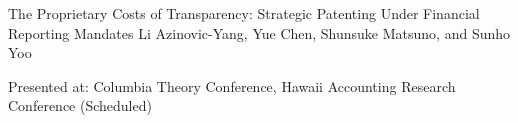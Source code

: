 \paperentry
	{The Proprietary Costs of Transparency: Strategic Patenting Under Financial Reporting Mandates}
	{Li Azinovic-Yang, Yue Chen, Shunsuke Matsuno, and Sunho Yoo}
	{}
	{}
	{}
	{}
	{
	\begin{cvitems} %
		\item {Presented at: Columbia Theory Conference, Hawaii Accounting Research Conference (Scheduled)}
	\end{cvitems}
	}





	
